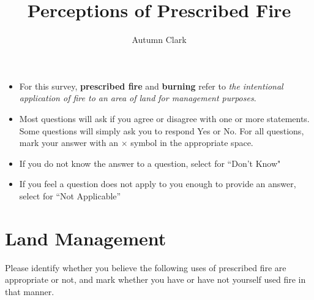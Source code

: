 \documentclass[
  english,
  ]{sdapsclassic}
\author{Autumn Clark}
\title{Perceptions of Prescribed Fire}
\begin{document}
 
  \begin{questionnaire}

    \begin{info}
\begin{itemize}
     \item For this survey, \textbf{prescribed fire} and \textbf{burning} refer to \emph{the intentional application of fire to an area of land for management purposes}.
      \item Most questions will ask if you agree or disagree with one or more statements. 
	     Some questions will simply ask you to respond Yes or No. 
	    For all questions, mark your answer with an $\times$ symbol in the appropriate space. 
      \item If you do not know the answer to a question, select {} for ``Don't Know"
      \item If you feel a question does not apply to you enough to provide an answer, select  for ``Not Applicable''
\end{itemize}
    \end{info}


    \section{Land Management}

    \begin{choicegroup}[rowsep=0.25em]{Please identify whether you believe the following uses of prescribed fire are appropriate or not, and mark whether you have or have not yourself used fire in that manner.}
      
      
    \end{choicegroup}



\end{questionnaire}
\end{document}
